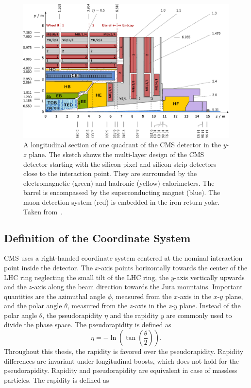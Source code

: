 \begin{figure}[htp]
    \centering
    \includegraphics[width=0.85\textheight,angle=90]{figures/experimental_setup/cms_longitudinal_section.pdf}
    \caption[Longitudinal section of the CMS
    detector]{A longitudinal section of one quadrant of the CMS
        detector in the $y$-$z$ plane. The sketch shows
    the multi-layer design of the CMS detector starting with the silicon pixel
and silicon strip detectors close to the interaction point. They are surrounded
by the electromagnetic (green) and hadronic (yellow) calorimeters. The barrel is
encompassed by the superconducting magnet (blue). The muon detection system
(red) is embedded in the iron return yoke. Taken from~\cite{Berger:2014aca}.}
    \label{fig:cms:longitudinal_section}
\end{figure}

\subsection{Definition of the Coordinate System}
\label{sec:coord_system}

CMS uses a right-handed coordinate system centered at the nominal interaction
point inside the detector. The $x$-axis points horizontally towards the center
of the LHC ring neglecting the small tilt of the LHC ring, the $y$-axis
vertically upwards and the $z$-axis along the beam direction towards the Jura
mountains. Important quantities are the azimuthal angle $\phi$, measured from
the $x$-axis in the $x$-$y$ plane, and the polar angle $\theta$, measured from
the $z$-axis in the $z$-$y$ plane. Instead of the polar angle $\theta$, the
pseudorapidity $\eta$ and the rapidity $y$ are commonly used to divide the
phase space. The pseudorapidity is defined as
%
\begin{equation*}
    \eta = - \ln \left( \tan \left( \frac{\theta}{2} \right) \right).
\end{equation*}
%
Throughout this thesis, the rapidity is favored over the pseudorapidity.
Rapidity differences are invariant under longitudinal boosts, which does not
hold for the pseudorapidity. Rapidity and pseudorapidity are equivalent in case
of massless particles. The rapidity is defined as

